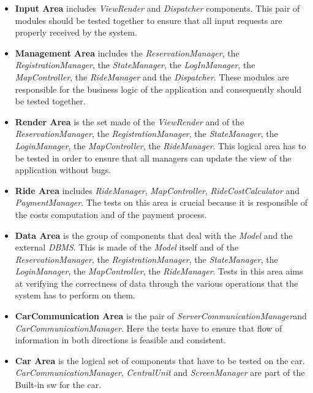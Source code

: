 \documentclass[11pt,a4paper]{report}
\begin{document}
\begin{itemize}
\item \textbf{Input Area} includes \textit{ViewRender} and \textit{Dispatcher} components. This pair of modules should be tested together to ensure that all input requests are properly received by the system.
\item \textbf{Management Area} includes the \textit{ReservationManager}, the \textit{RegistrationManager}, the \textit{StateManager}, the \textit{LogInManager}, the \textit{MapController}, the \textit{RideManager} and the \textit{Dispatcher}. These modules are responsible for the business logic of the application and consequently should be tested together.
\item \textbf{Render Area} is the set made of the \textit{ViewRender} and of the \textit{ReservationManager}, the \textit{RegistrationManager}, the \textit{StateManager}, the \textit{LoginManager}, the \textit{MapController}, the \textit{RideManager}. This logical area has to be tested in order to ensure that all managers can update the view of the application without bugs.
\item \textbf{Ride Area} includes \textit{RideManager},  \textit{MapController}, \textit{RideCostCalculator} and \textit{PaymentManager}. The tests on this area is crucial because it is responsible of the costs computation and of the payment process.
\item \textbf{Data Area} is the group of components that deal with the \textit{Model} and the external \textit{DBMS}. This is made of the \textit{Model} itself and of the \textit{ReservationManager}, the \textit{RegistrationManager}, the \textit{StateManager}, the \textit{LoginManager}, the \textit{MapController}, the \textit{RideManager}. Tests in this area aims at verifying the correctness of data through the various operations that the system has to perform on them.
\item \textbf{CarCommunication Area} is the pair of \textit{ServerCommunicationManager}and \textit{CarCommunicationManager}. Here the tests have to ensure that flow of information in both directions is feasible and consistent.
\item \textbf{Car Area} is the logical set of components that have to be tested on the car. \textit{CarCommunicationManager}, \textit{CentralUnit} and \textit{ScreenManager} are part of the Built-in sw for the car. 
\end{itemize}
\end{document}
